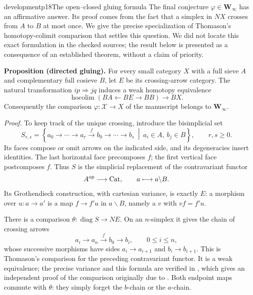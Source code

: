 \begin{dcomment}{development}{p18}{The open--closed gluing formula}
The final conjecture $\varphi\in\mathbf W_\infty$ has an affirmative answer. Its proof comes from the fact that a simplex in $NX$ crosses from $A$ to $B$ at most once. We give the precise specialization of Thomason's homotopy-colimit comparison that settles this question. We did not locate this exact formulation in the checked sources; the result below is presented as a consequence of an established theorem, without a claim of priority.

\textbf{Proposition (directed gluing).}\ours
For every small category $X$ with a full sieve $A$ and complementary full cosieve $B$, let $E$ be its crossing-arrow category. The natural transformation $ip\Rightarrow jq$ induces a weak homotopy equivalence
\[
 \operatorname{hocolim}(BA\longleftarrow BE\longrightarrow BB)
 \longrightarrow BX.
\]
Consequently the comparison $\varphi:\mathcal X\to X$ of the manuscript belongs to $\mathbf W_\infty$.

\emph{Proof.} To keep track of the unique crossing, introduce the bisimplicial set
\[
 S_{r,s}=\left\{
 a_0\longrightarrow\cdots\longrightarrow a_r
 \xrightarrow{f}b_0\longrightarrow\cdots\longrightarrow b_s
 \ \middle|\ a_i\in A,\ b_j\in B
 \right\},\qquad r,s\geq0.
\]
Its faces compose or omit arrows on the indicated side, and its degeneracies insert identities. The last horizontal face precomposes $f$; the first vertical face postcomposes $f$. Thus $S$ is the simplicial replacement of the contravariant functor
\[
 A^{\mathrm{op}}\longrightarrow\mathrm{Cat},\qquad
 a\longmapsto a\backslash B.
\]
Its Grothendieck construction, with cartesian variance, is exactly $E$: a morphism over $u:a\to a'$ is a map $f\to f'u$ in $a\backslash B$, namely a $v$ with $vf=f'u$.

There is a comparison $\theta:\operatorname{diag}S\to NE$. On an $n$-simplex it gives the chain of crossing arrows
\[
 a_i\longrightarrow a_n\xrightarrow{f}b_0
 \longrightarrow b_i,\qquad 0\leq i\leq n,
\]
whose successive morphisms have sides $a_i\to a_{i+1}$ and $b_i\to b_{i+1}$. This is Thomason's comparison for the preceding contravariant functor. It is a weak equivalence; the precise variance and this formula are verified in \citet[\S3.1, equation~(9), and Theorem~3]{Cegarra2020}, which gives an independent proof of the comparison originally due to \citet[Theorem~1.2]{Thomason1979}. Both endpoint maps commute with $\theta$: they simply forget the $b$-chain or the $a$-chain.


\end{dcomment}
